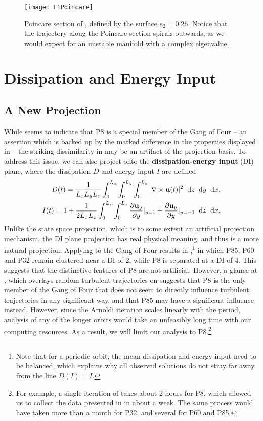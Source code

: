 \begin{figure}[h!]
\centerline{\texttt{[image: E1Poincare]}}
\caption{Poincare section of , defined by the surface $e_2 = 0.26$. Notice that the trajectory along the Poincare section spirals outwards, as we would expect for an unstable manifold with a complex eigenvalue.}\label{fig:E1Poincare}
\end{figure}

\section{Dissipation and Energy Input} \label{sec:DI}
  
\subsection{A New Projection}
While  seems to indicate that P8 is a special member of the Gang of Four -- an assertion which is backed up by the marked difference in the properties displayed in  -- the striking dissimilarity in  may be an artifact of the projection basis. To address this issue, we can also project onto the {\bf dissipation-energy input} (DI) plane, where the dissipation $D$ and energy input $I$ are defined
\begin{align}
D(t) = \frac{1}{L_xL_yL_z}\int{0}{L_x}{\int{0}{L_y}{\int{0}{L_z}{|\nabla\times\Vector{u}(t)|^2}{\textrm{d}z}}{\textrm{d}y}}{\textrm{d}x},\label{eq:diss}\\
I(t)  = 1 + \frac{1}{2L_xL_z}\int{0}{L_x}{\int{0}{L_z}{\pder{1}{\Vector{u}_{y}}{y} |_{y=1}+\pder{1}{\Vector{u}_{y}}{y} |_{y=-1}}{\textrm{d}z}}{\textrm{d}x}.\label{eq:einp}
\end{align} 
Unlike the state space projection, which is to some extent an artificial projection mechanism, the DI plane projection has real physical meaning, and thus is a more natural projection. Applying  to the Gang of Four results in ,\footnote{Note that for a periodic orbit, the mean dissipation and energy input need to be balanced, which explains why all observed solutions do not stray far away from the line $D(I) = I$.} in which P85, P60 and P32 remain clustered near a DI of 2, while P8 is separated at a DI of 4. This suggests that the distinctive features of P8 are not artificial. However, a glance at , which overlays random turbulent trajectories on  suggests that P8 is the only member of the Gang of Four that does not seem to directly influence turbulent trajectories in any significant way, and that P85 may have a significant influence instead. However, since the Arnoldi iteration scales linearly with the period, analysis of any of the longer orbits would take an unfeasibly long time with our computing resources. As a result, we will limit our analysis to P8.\footnote{For example, a single iteration of  takes about 2 hours for P8, which allowed us to collect the data presented in  in about a week. The same process would have taken more than a month for P32, and several for P60 and P85.}   
